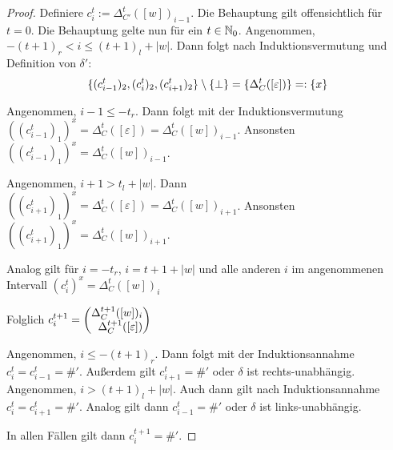 \begin{proof}
    Definiere $c^t_i := \Delta_{C'}^t([w])_{i-1}$.
    Die Behauptung gilt offensichtlich für $t = 0$.
    Die Behauptung gelte nun für ein $t \in \mathbb{N}_0$.
    Angenommen, $-(t+1)_r < i \leq (t+1)_l + |w|$.
    Dann folgt nach Induktionsvermutung und Definition von $\delta'$: \[
    \{ { (c^t_{i-1})_2, (c^t_{i})_2, (c^t_{i+1})_2} \} \setminus \{ { \perp } \} = \{ { \Delta^t_{C}([\varepsilon])} \} =: \{ {x} \}
    \]
    
    Angenommen, $i - 1 \leq -t_r$. Dann folgt mit der Induktionsvermutung $((c^t_{i-1})_1)^x = \Delta^t_{C}([\varepsilon]) = \Delta^t_{C}([w])_{i-1}$.
    Ansonsten $((c^t_{i-1})_1)^x = \Delta^t_C([w])_{i-1}$.
    
    Angenommen, $i + 1 > t_l + |w|$. Dann $((c^t_{i+1})_1)^x = \Delta^t_{C}([\varepsilon]) = \Delta^t_{C}([w])_{i+1}$.
    Ansonsten $((c^t_{i+1})_1)^x = \Delta^t_C([w])_{i+1}$.
    
    Analog gilt für $i = -t_r$, $i = t + 1 + |w|$ und alle anderen $i$ im angenommenen Intervall $(c^t_{i})^x = \Delta^t_C([w])_i$
    
    Folglich $c^{t+1}_i = \Spvek{\Delta^{t+1}_C([w])_i; \Delta^{t+1}_{C}([\varepsilon])}$
    
    Angenommen, $i \leq -(t+1)_r$. Dann folgt mit der Induktionsannahme $c^t_{i} = c^t_{i-1} = \#'$.
    Außerdem gilt $c^t_{i+1} = \#'$ oder $\delta$ ist rechts-unabhängig.
    Angenommen, $i > (t+1)_l + |w|$. Auch dann gilt nach Induktionsannahme $c^t_{i} = c^t_{i+1} = \#'$.
    Analog gilt dann $c^t_{i-1} = \#'$ oder $\delta$ ist links-unabhängig.
    
    In allen Fällen gilt dann $c^{t+1}_i = \#'$.
\end{proof}

